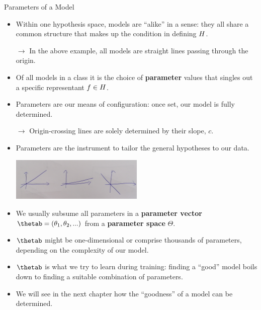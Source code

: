 \documentclass[11pt,compress,t,notes=noshow, xcolor=table]{beamer}
\begin{document}
\begin{vbframe}{Parameters of a Model}

\begin{itemize}

  \item Within one hypothesis space, models are \enquote{alike} in a sense: they 
  all share a common structure that makes up the condition in defining 
  $H$.
  
  $\rightarrow$ In the above example, all models are straight lines passing
  through the origin.
    
  \item Of all models in a class it is the choice of \textbf{parameter} values 
  that singles out a specific representant $f \in H$.
  
  \item Parameters are our means of configuration: once set, our model is fully
  determined.
  
  $\rightarrow$ Origin-crossing lines are solely determined by their slope, $c$.
  
  \item Parameters are the instrument to tailor the general 
  hypotheses to our data.

  
  \begin{center}
    \includegraphics[width = 0.5\textwidth]{figure_man/lines.jpg} 
  \end{center}
  
  \framebreak
  
  \item We usually subsume all parameters in a \textbf{parameter vector} 
  $\thetab = (\theta_1, \theta_2, ...)$ from a \textbf{parameter space} 
  $\Theta$.
  
  \item $\thetab$ might be one-dimensional or comprise thousands of parameters,
  depending on the complexity of our model.
  
  \item $\thetab$ is what we try to learn during training: finding a 
  \enquote{good} model boils down to finding a suitable combination of 
  parameters.
  
  \item We will see in the next chapter how the \enquote{goodness} of a model 
  can be determined.
  
\end{itemize}

\end{vbframe}


\endlecture
\end{document}

